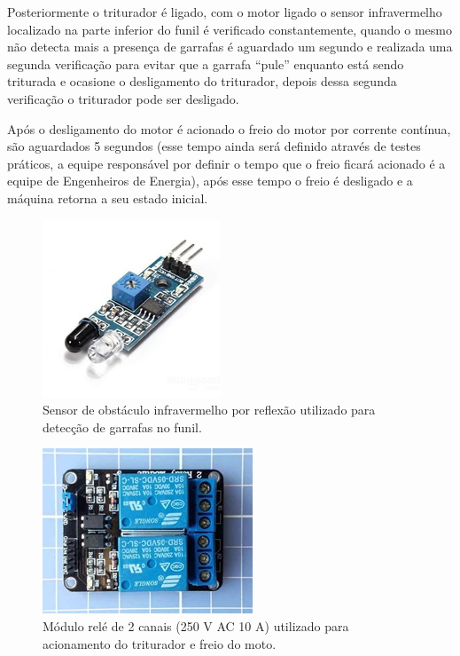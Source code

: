 Posteriormente o triturador é ligado, com o motor ligado o sensor infravermelho localizado na parte inferior do funil é verificado constantemente, quando o mesmo não detecta mais a presença de garrafas é aguardado um segundo e realizada uma segunda verificação para evitar que a garrafa “pule” enquanto está sendo triturada e ocasione o desligamento do triturador, depois dessa segunda verificação o triturador pode ser desligado.

Após o desligamento do motor é acionado o freio do motor por corrente contínua, são aguardados 5 segundos (esse tempo ainda será definido através de testes práticos, a equipe responsável por definir o tempo que o freio ficará acionado é a equipe de Engenheiros de Energia), após esse tempo o freio é desligado e a máquina retorna a seu estado inicial.

\begin{figure}[!ht]
	\centering
		\includegraphics[scale=0.8]{figuras/eletronica/21-Sensor-de-obstaculo-infravermelho-reflexao-p-deteccao-garrafas-no-funil.jpg}
	\caption{Sensor de obstáculo infravermelho por reflexão utilizado para detecção de garrafas no funil.}
\end{figure}

\begin{figure}[!ht]
	\centering
		\includegraphics[scale=0.7]{figuras/eletronica/22-Modulo-rele-de-2-canais.jpg}
	\caption{Módulo relé de 2 canais (250 V AC 10 A) utilizado para acionamento do triturador e freio do moto.}
\end{figure}

